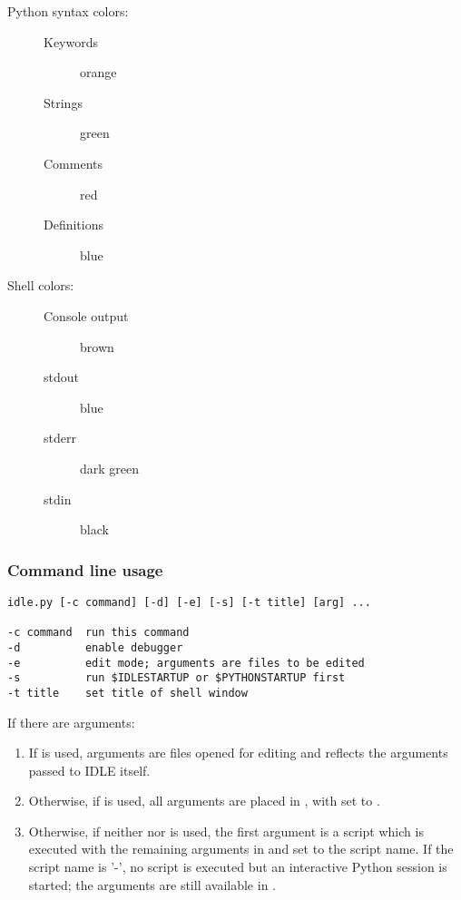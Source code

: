 \begin{description}
\item[Python syntax colors:]

\begin{description}
\item[Keywords]       orange
\item[Strings ]       green
\item[Comments]       red
\item[Definitions]    blue
\end{description}

\item[Shell colors:]
\begin{description}
\item[Console output] brown
\item[stdout]         blue
\item[stderr]       dark green
\item[stdin]       black
\end{description}
\end{description}


\subsubsection{Command line usage}

\begin{verbatim}
idle.py [-c command] [-d] [-e] [-s] [-t title] [arg] ...

-c command  run this command
-d          enable debugger
-e          edit mode; arguments are files to be edited
-s          run $IDLESTARTUP or $PYTHONSTARTUP first
-t title    set title of shell window
\end{verbatim}

If there are arguments:

\begin{enumerate}
\item   If  is used, arguments are files opened for
        editing and  reflects the arguments passed to
        IDLE itself.

\item   Otherwise, if  is used, all arguments are
        placed in , with  set
        to .

\item   Otherwise, if neither  nor  is
        used, the first argument is a script which is executed with
        the remaining arguments in   and
         set to the script name.  If the script name
        is '-', no script is executed but an interactive Python
        session is started; the arguments are still available in
        .
\end{enumerate}


